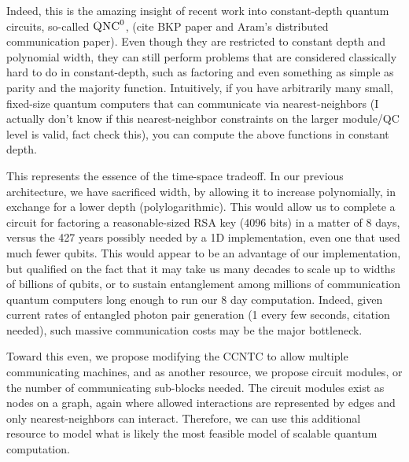 \documentclass{article}
\begin{document}
Indeed, this is the amazing insight of recent work into constant-depth
quantum circuits, so-called $\textsc{QNC}^0$, (cite BKP paper and Aram's
distributed communication paper). Even though
they are restricted to constant depth and polynomial width, they can still
perform problems that are considered classically hard to do in
constant-depth, such as factoring and even something as simple as parity
and the majority function. Intuitively, if you have arbitrarily many
small, fixed-size quantum computers that can communicate via
nearest-neighbors (I actually don't know if this nearest-neighbor constraints
on the larger module/QC level is valid, fact check this), you can compute
the above functions in constant depth.

This represents the essence of the time-space tradeoff. In our previous
architecture, we have sacrificed width, by allowing it to increase polynomially,
in exchange for a lower depth (polylogarithmic). This would allow us to
complete a circuit for factoring a reasonable-sized RSA key (4096 bits)
in a matter of 8 days, versus the 427 years possibly needed by a 1D
implementation, even one that used much fewer qubits. This would appear to
be an advantage of our implementation, but qualified on the fact that it may
take us many decades to scale up to widths of billions of qubits, or to
sustain entanglement among millions of communication quantum computers long
enough to run our 8 day computation. Indeed, given current rates of
entangled photon pair generation (1 every few seconds, citation needed),
such massive communication costs may be the major bottleneck.

Toward this even, we propose modifying the CCNTC to allow multiple
communicating machines, and as another resource, we propose circuit
modules, or the number of communicating sub-blocks needed. The circuit
modules exist as nodes on a graph, again where allowed interactions are
represented by edges and only nearest-neighbors can interact. Therefore,
we can use this additional resource to model what is likely the most
feasible model of scalable quantum computation.
\end{document}
